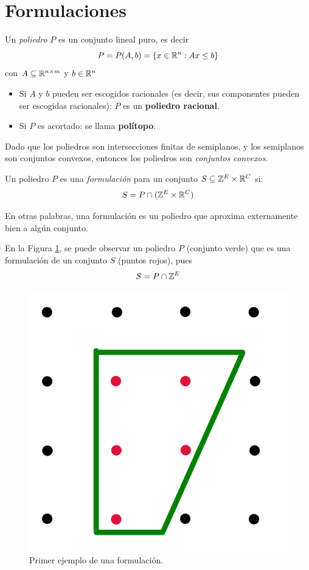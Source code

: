\section{Formulaciones}
\begin{defi}[Poliedro] Un \emph{poliedro} $P$ es un conjunto lineal puro, es decir
$$P=P(A,b)=\{x\in \mathbb R^n:Ax\leq b\}$$
con $A\subseteq \mathbb R^{n\times m}$ y $b\in \mathbb R^n$
\end{defi}
\begin{itemize}
    \item Si $A$ y $b$ pueden ser escogidos racionales (es decir, sus componentes pueden ser escogidas racionales): $P$ es un \textbf{poliedro racional}.
    \item Si $P$ es acortado: se llama \textbf{polítopo}.
\end{itemize}
\begin{obs}
Dado que los poliedros son intersecciones finitas de semiplanos, y los semiplanos son conjuntos convexos, entonces los poliedros son \textit{conjuntos convexos}.
\end{obs}
\begin{defi}[Formulación] Un poliedro $P$ es una \emph{formulación} para un conjunto $S\subseteq\mathbb Z^E \times \mathbb R^ C$ si:
$$S=P\cap (\mathbb Z^E \times \mathbb R^C)$$
\end{defi}
En otras palabras, una formulación es un poliedro que aproxima externamente bien a algún conjunto.

\begin{eje} \label{eje:formulacion1}
En la Figura \ref{fig:formulacion1}, se puede observar un poliedro $P$ (conjunto verde) que es una formulación de un conjunto $S$ (puntos rojos), pues $$S = P \cap \mathbb Z^{E}$$ 
\begin{figure}[H] 
    \centering
    \includegraphics[scale=0.3]{formulacion1.png}
    \caption{Primer ejemplo de una formulación.}
    \label{fig:formulacion1}
\end{figure}
\end{eje}

